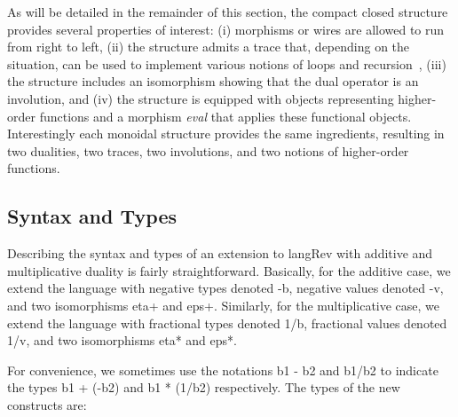 \documentclass[preprint]{sigplanconf}
\begin{document}
As will be detailed in the remainder of this section, the compact closed
structure provides several properties of interest: (i) morphisms or wires are
allowed to run from right to left, (ii) the structure admits a trace that,
depending on the situation, can be used to implement various notions of loops
and
recursion~\cite{joyal1996traced,Hasegawa:2009:TMC:1552068.1552069,Hasegawa:1997:RCS:645893.671607},
(iii) the structure includes an isomorphism showing that the dual operator is
an involution, and (iv) the structure is equipped with objects representing
higher-order functions and a morphism \textit{eval} that applies these
functional objects. Interestingly each monoidal structure provides the same
ingredients, resulting in two dualities, two traces, two involutions, and two
notions of higher-order functions.

\subsection{Syntax and Types} 

Describing the syntax and types of an extension to {{langRev}} with additive
and multiplicative duality is fairly straightforward. Basically, for the
additive case, we extend the language with negative types denoted {{-b}},
negative values denoted {{-v}}, and two isomorphisms {{eta+}} and
{{eps+}}. Similarly, for the multiplicative case, we extend the language with
fractional types denoted {{1/b}}, fractional values denoted {{1/v}}, and two
isomorphisms {{eta*}} and {{eps*}}. 

%


For convenience, we sometimes use the notations {{b1 - b2}} and
{{b1/b2}} to indicate the types {{b1 + (-b2)}} and {{b1 * (1/b2)}}
respectively.  The types of the new constructs are:
\vspace{-15pt}
\begin{multicols}{2}  

%
\end{multicols}
\end{document}
